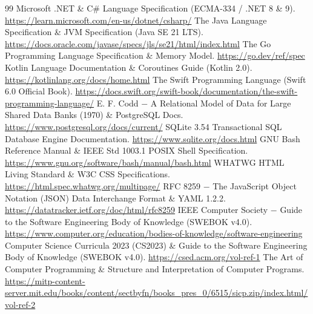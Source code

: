 \documentclass{book}
\begin{document}
\begin{thebibliography}{99}
 Microsoft .NET \& C\# Language Specification (ECMA-334 / .NET 8 \& 9). \url{https://learn.microsoft.com/en-us/dotnet/csharp/}
 The Java Language Specification \& JVM Specification (Java SE 21 LTS). \url{https://docs.oracle.com/javase/specs/jls/se21/html/index.html}
 The Go Programming Language Specification \& Memory Model. \url{https://go.dev/ref/spec}
 Kotlin Language Documentation \& Coroutines Guide (Kotlin 2.0). \url{https://kotlinlang.org/docs/home.html}
 The Swift Programming Language (Swift 6.0 Official Book). \url{https://docs.swift.org/swift-book/documentation/the-swift-programming-language/}
 E. F. Codd \(-\) A Relational Model of Data for Large Shared Data Banks (1970) \& PostgreSQL Docs. \url{https://www.postgresql.org/docs/current/}
 SQLite 3.54 Transactional SQL Database Engine Documentation. \url{https://www.sqlite.org/docs.html}
 GNU Bash Reference Manual \& IEEE Std 1003.1 POSIX Shell Specification. \url{https://www.gnu.org/software/bash/manual/bash.html}
 WHATWG HTML Living Standard \& W3C CSS Specifications. \url{https://html.spec.whatwg.org/multipage/}
 RFC 8259 \(-\) The JavaScript Object Notation (JSON) Data Interchange Format \& YAML 1.2.2. \url{https://datatracker.ietf.org/doc/html/rfc8259}
 IEEE Computer Society \(-\) Guide to the Software Engineering Body of Knowledge (SWEBOK v4.0). \url{https://www.computer.org/education/bodies-of-knowledge/software-engineering}
 Computer Science Curricula 2023 (CS2023) \& Guide to the Software Engineering Body of Knowledge (SWEBOK v4.0). \url{https://csed.acm.org/vol-ref-1}
 The Art of Computer Programming \& Structure and Interpretation of Computer Programs. \url{https://mitp-content-server.mit.edu/books/content/sectbyfn/books_pres_0/6515/sicp.zip/index.html/vol-ref-2}
\end{thebibliography}
\end{document}

